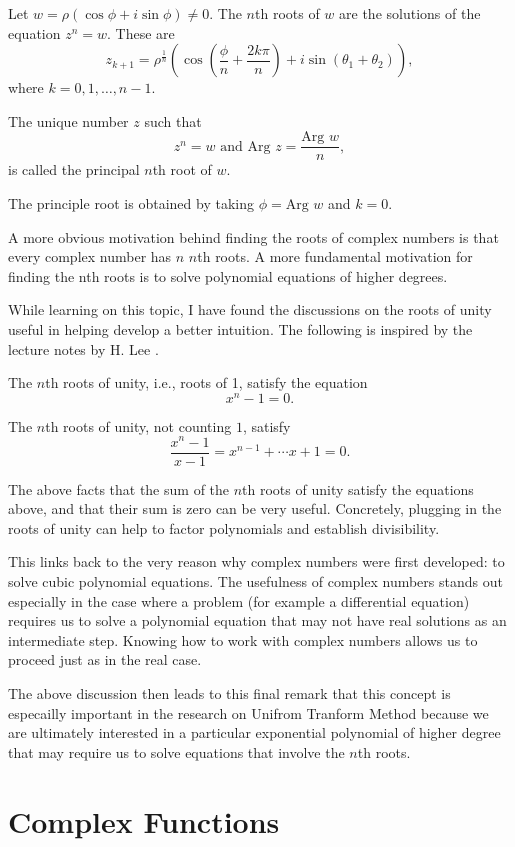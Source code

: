 \documentclass[11pt,reqno,oneside,a4paper]{article}
\begin{document}
Let $w = \rho (\cos \phi + i\sin \phi) \neq 0.$ The $n$th roots of $w$ are the solutions of the equation $z^n= w$. These are
$$z_{k+1} = \rho^{\frac{1}{n}}(\cos(\frac{\phi}{n}+\frac{2k\pi}{n})+ i\sin(\theta_1 +\theta_2)),$$
where $k = 0,1,\dots,n-1$.

The unique number $z$ such that 
$$z^n =w \text{ and Arg }z = \frac{\text{Arg }w}{n},$$
is called the principal $n$th root of $w$.

The principle root is obtained by taking $\phi = \text{Arg }w$ and $k=0$. 

\begin{rmk}
A more obvious motivation behind finding the roots of complex numbers is that every complex number has $n$ $n$th roots. A more fundamental motivation for finding the nth roots is to solve polynomial equations of higher degrees. 

While learning on this topic, I have found the discussions on the roots of unity useful in helping develop a better intuition. The following is inspired by the lecture notes by H. Lee \cite{Lee2015a}. 

The $n$th roots of unity, i.e., roots of 1, satisfy the equation
$$x^n -1 = 0.$$

The $n$th roots of unity, not counting $1$, satisfy
$$\frac{x^n -1 }{x-1} = x^{n-1} + \cdots x+ 1 = 0.$$

The above facts that the sum of the $n$th roots of unity satisfy the equations above, and that their sum is zero can be very useful. Concretely, plugging in the roots of unity can help to factor polynomials and establish divisibility.

This links back to the very reason why complex numbers were first developed: to solve cubic polynomial equations. The usefulness of complex numbers stands out especially in the case where a problem (for example a differential equation) requires us to solve a polynomial equation that may not have real solutions as an intermediate step. Knowing how to work with complex numbers allows us to proceed just as in the real case. 

The above discussion then leads to this final remark that this concept is especailly important in the research on Unifrom Tranform Method because we are ultimately interested in a particular exponential polynomial of higher degree that may require us to solve equations that involve the $n$th roots. 
\end{rmk}

\section{Complex Functions}
\end{document}
